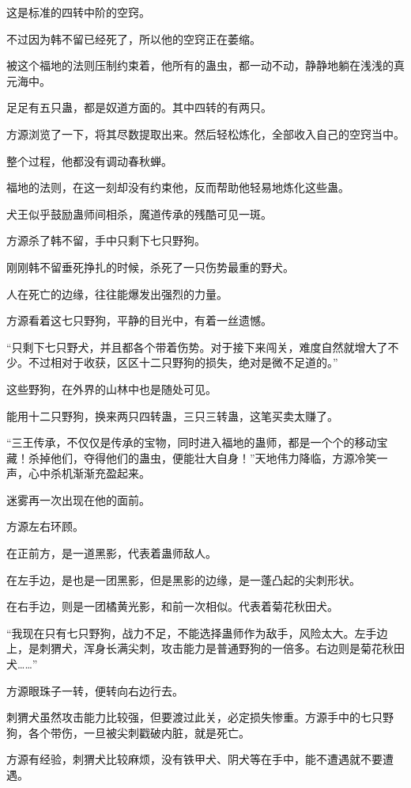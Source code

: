 \begin{this_body}
这是标准的四转中阶的空窍。

不过因为韩不留已经死了，所以他的空窍正在萎缩。

被这个福地的法则压制约束着，他所有的蛊虫，都一动不动，静静地躺在浅浅的真元海中。

足足有五只蛊，都是奴道方面的。其中四转的有两只。

方源浏览了一下，将其尽数提取出来。然后轻松炼化，全部收入自己的空窍当中。

整个过程，他都没有调动春秋蝉。

福地的法则，在这一刻却没有约束他，反而帮助他轻易地炼化这些蛊。

犬王似乎鼓励蛊师间相杀，魔道传承的残酷可见一斑。

方源杀了韩不留，手中只剩下七只野狗。

刚刚韩不留垂死挣扎的时候，杀死了一只伤势最重的野犬。

人在死亡的边缘，往往能爆发出强烈的力量。

方源看着这七只野狗，平静的目光中，有着一丝遗憾。

“只剩下七只野犬，并且都各个带着伤势。对于接下来闯关，难度自然就增大了不少。不过相对于收获，区区十二只野狗的损失，绝对是微不足道的。”

这些野狗，在外界的山林中也是随处可见。

能用十二只野狗，换来两只四转蛊，三只三转蛊，这笔买卖太赚了。

“三王传承，不仅仅是传承的宝物，同时进入福地的蛊师，都是一个个的移动宝藏！杀掉他们，夺得他们的蛊虫，便能壮大自身！”天地伟力降临，方源冷笑一声，心中杀机渐渐充盈起来。

迷雾再一次出现在他的面前。

方源左右环顾。

在正前方，是一道黑影，代表着蛊师敌人。

在左手边，是也是一团黑影，但是黑影的边缘，是一蓬凸起的尖刺形状。

在右手边，则是一团橘黄光影，和前一次相似。代表着菊花秋田犬。

“我现在只有七只野狗，战力不足，不能选择蛊师作为敌手，风险太大。左手边上，是刺猬犬，浑身长满尖刺，攻击能力是普通野狗的一倍多。右边则是菊花秋田犬……”

方源眼珠子一转，便转向右边行去。

刺猬犬虽然攻击能力比较强，但要渡过此关，必定损失惨重。方源手中的七只野狗，各个带伤，一旦被尖刺戳破内脏，就是死亡。

方源有经验，刺猬犬比较麻烦，没有铁甲犬、阴犬等在手中，能不遭遇就不要遭遇。


\end{this_body}
